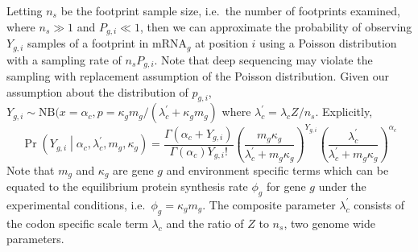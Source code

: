 \documentclass{article}
\newcommand{\alphac}{\ensuremath{{\alpha_c}}\xspace}
\newcommand{\lambdac}{\ensuremath{{\lambda_c}}\xspace}
\newcommand{\lambdacprime}{\ensuremath{{\lambda_c^\prime}}\xspace}
\newcommand{\pgi}{\ensuremath{{p_{g,i}}}\xspace}
\newcommand{\Pgi}{\ensuremath{{P_{g,i}}}\xspace}
\newcommand{\ns}{\ensuremath{{n_s}}\xspace}
\newcommand{\mg}{\ensuremath{{m_g}}\xspace}
\newcommand{\phig}{\ensuremath{{\phi_g}}\xspace}
\newcommand{\kappag}{\ensuremath{{\kappa_{g}}}\xspace}
\newcommand{\Ztheta}{\ensuremath{{Z}}\xspace}
\newcommand{\mRNAg}{mRNA$_g$\xspace}
\newcommand{\Ygi}{\ensuremath{{Y_{g,i}}}\xspace}
\begin{document}
Letting $\ns$ be the footprint sample size, i.e.~the number of footprints examined, where $\ns \gg 1$ and $\Pgi \ll 1$, then we can approximate the probability of observing $\Ygi$ samples of a footprint in \mRNAg at position $i$ using a Poisson distribution with a sampling rate of $\ns \Pgi$.
Note that deep sequencing may violate the sampling with replacement assumption of the Poisson distribution.
Given our assumption about the distribution of $\pgi$,  $\Ygi \sim \text{NB}(x = \alphac, p = \kappag \mg /(\lambdacprime + \kappag \mg)$ where $\lambdacprime = \lambdac \Ztheta/\ns$.
Explicitly,
\begin{equation}
  \label{eq:distYgSite}
  \Pr\left(\Ygi \middle| \alphac, \lambdacprime, \mg, \kappag\right) = \frac{\Gamma\left(\alphac + \Ygi\right)}{\Gamma\left(\alphac\right) \Ygi!} 
  \left(\frac{\mg \kappag}{\lambdacprime + \mg \kappag}\right)^\Ygi \left(\frac{\lambdacprime}{\lambdacprime + \mg \kappag}\right)^\alphac
\end{equation}
Note that $\mg$ and \kappag are gene $g$ and environment specific terms which can be equated to the equilibrium protein synthesis rate $\phi_g$ for gene $g$ under the experimental conditions, i.e.~$\phig = \kappag \mg$.
The composite parameter \lambdacprime consists of the codon specific scale term \lambdac and  the ratio of \Ztheta to \ns, two genome wide parameters.
\end{document}
